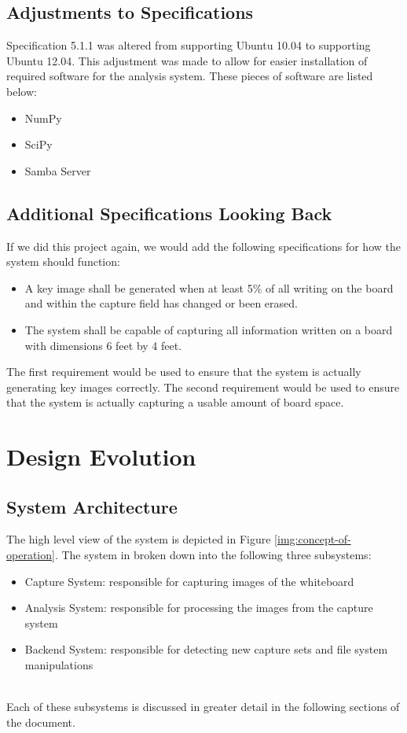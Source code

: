 \documentclass[]{article}
\begin{document}
		\subsection{Adjustments to Specifications}
			Specification 5.1.1 was altered from supporting Ubuntu 10.04 to supporting Ubuntu 12.04. This adjustment was made to allow for easier installation of required software for the analysis system. These pieces of software are listed below:
			\begin{itemize}
				\item NumPy
				\item SciPy
				\item Samba Server
			\end{itemize}
			
		\subsection{Additional Specifications Looking Back}
			If we did this project again, we would add the following specifications for how the system should function:
			\begin{itemize}
				\item A key image shall be generated when at least 5\% of all writing on the board and within the capture field has changed or been erased.
				\item The system shall be capable of capturing all information written on a board with dimensions 6 feet by 4 feet.
			\end{itemize}
			The first requirement would be used to ensure that the system is actually generating key images correctly. The second requirement would be used to ensure that the system is actually capturing a usable amount of board space.
					
	\section{Design Evolution}
		
		\subsection{System Architecture}
			The high level view of the system is depicted in Figure \ref{img:concept-of-operation}. The system in broken down into the following three subsystems:
			\begin{itemize}
				\item Capture System: responsible for capturing images of the whiteboard
				\item Analysis System: responsible for processing the images from the capture system
				\item Backend System: responsible for detecting new capture sets and file system manipulations
			\end{itemize}
			\\
			Each of these subsystems is discussed in greater detail in the following sections of the document. 
			
\end{document}
